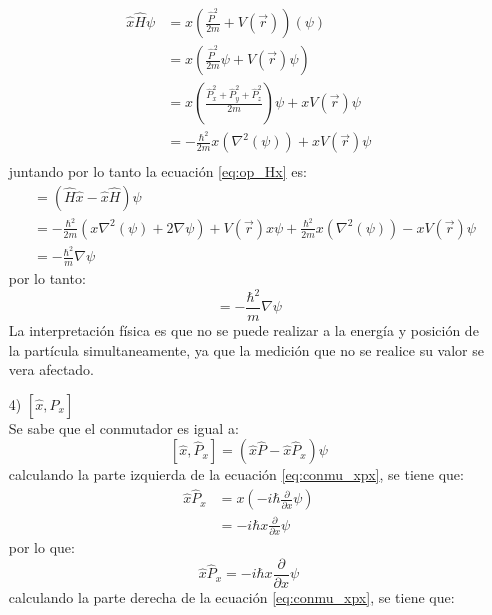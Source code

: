 \documentclass[12pt,letterpaper]{article}
\begin{document}
\begin{enumerate}
    \begin{align}
        \label{eq:Hx_der}
        \hat{x}\hat{H}\psi &= x\left(\frac{\hat{P}^2}{2m} +V(\vec{r}) \right) (\psi)\\ 
        &= x\left( \frac{\hat{P}^2 }{2m} \psi + V(\vec{r})\psi \right) \\
        &= x\left(\frac{\hat{P}^2_x+\hat{P}^2_y+\hat{P}^2_z }{2m}\right) \psi + xV(\vec{r})\psi \\
        &= -\frac{\hbar^2}{2m} x\left(\nabla^2(\psi)\right)+ xV(\vec{r})\psi \\
    \end{align}
    juntando por lo tanto la ecuación \ref{eq:op_Hx} es:
    \begin{align*}
        [\hat{H},\hat{x}]&=(\hat{H}\hat{x}-\hat{x}\hat{H})\psi \\
        &=-\frac{\hbar^2}{2m} \left(x\nabla^2(\psi) + 2 \nabla \psi \right)+ V(\vec{r})x\psi+\frac{\hbar^2}{2m} x\left(\nabla^2(\psi)\right)- xV(\vec{r})\psi \\
        &=-\frac{\hbar^2}{m} \nabla \psi
    \end{align*}
    por lo tanto:
    \begin{equation*}
        [\hat{H},\hat{x}]=-\frac{\hbar^2}{m} \nabla \psi
    \end{equation*}
    La interpretación física es que no se puede realizar a la energía y posición de la partícula simultaneamente, ya que la medición que no se realice su valor se vera afectado.
    \item[4)] $[\hat{x},\hat{P}_x]$\\
    Se sabe que el conmutador es igual a:
    \begin{equation}
        \label{eq:conmu_xpx}
        [\hat{x},\hat{P}_x]= (\hat{x}\hat{P}-\hat{x}\hat{P}_x)\psi
    \end{equation}
    calculando la parte izquierda de la ecuación \ref{eq:conmu_xpx}, se tiene que:
    \begin{align*}
        \hat{x}\hat{P}_x &= x\left( - i\hbar \frac{\partial}{\partial x} \psi\right)\\
        &= -i \hbar x \frac{\partial}{\partial x} \psi
    \end{align*}
    por lo que: 
    \begin{equation}
        \label{eq:xpx_izq}
        \hat{x}\hat{P}_x= -i \hbar x \frac{\partial}{\partial x} \psi
    \end{equation}
    calculando la parte derecha de la ecuación \ref{eq:conmu_xpx}, se tiene que:

\end{enumerate}
\end{document}
